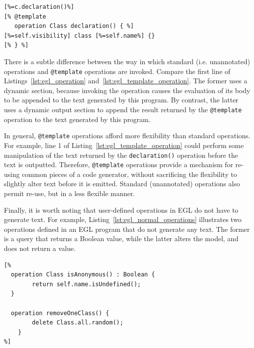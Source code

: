 \begin{lstlisting}[float=tbp, basicstyle=\ttfamily\footnotesize, language=EGL, tabsize=2, flexiblecolumns=true, caption=Using a template operation to specify the text generated for a declaration of a Java class., label=lst:egl_template_operation]
[%=c.declaration()%]
[% @template
   operation Class declaration() { %]
[%=self.visibility] class [%=self.name%] {}
[% } %]
\end{lstlisting}

There is a subtle difference between the way in which standard (i.e. unannotated)
operations and \texttt{@template} operations are invoked. Compare the first line of Listings~\ref{lst:egl_operation} and~\ref{lst:egl_template_operation}. The former
uses a dynamic section, because invoking the operation causes the evaluation of 
its body to be appended to the text generated by this program. By contrast, the 
latter uses a dynamic output section to append the result returned by 
the \texttt{@template} operation to the text generated by this program.

In general, \texttt{@template} operations afford more flexibility than standard
operations. For example, line 1 of Listing~\ref{lst:egl_template_operation} could
perform some manipulation of the text returned by the \texttt{declaration()} operation
before the text is outputted. Therefore, \texttt{@template} operations provide
a mechanism for re-using common pieces of a code generator, without sacrificing the
flexibility to slightly alter text before it is emitted. Standard (unannotated) 
operations also permit re-use, but in a less flexible manner.

Finally, it is worth noting that user-defined operations in EGL do not have to 
generate text. For example, Listing~\ref{lst:egl_normal_operations} 
illustrates two operations defined in an EGL program that do not generate any text.
The former is a query that returns a Boolean value, while the latter alters the model,
and does not return a value.

\begin{lstlisting}[float=tbp, basicstyle=\ttfamily\footnotesize, language=EGL, tabsize=2, flexiblecolumns=true, caption=Operations that do not generate any text., label=lst:egl_normal_operations]
[%
  operation Class isAnonymous() : Boolean {
		return self.name.isUndefined();
  }

  operation removeOneClass() {
		delete Class.all.random();
	}
%]
\end{lstlisting}

